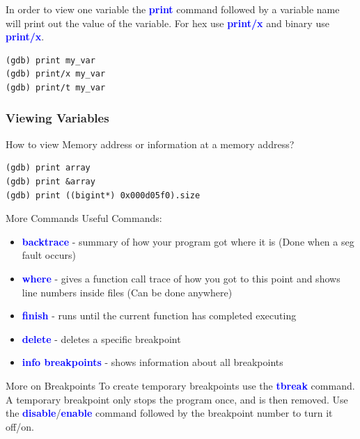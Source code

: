 \documentclass[11pt]{beamer}
\begin{document}
\begin{frame}[fragile]
In order to view one variable the \textbf{\textcolor{blue}{print}} command followed by a variable name will print out the value of the variable. For hex use \textbf{\textcolor{blue}{print/x}} and binary use \textbf{\textcolor{blue}{print/x}}.

\begin{lstlisting}[style=BashInputStyle]
(gdb) print my_var
(gdb) print/x my_var
(gdb) print/t my_var
\end{lstlisting}
\end{frame}

\begin{frame}[fragile]
\frametitle{Viewing Variables}

How to view Memory address or information at a memory address?
\begin{lstlisting}[style=BashInputStyle]
(gdb) print array
(gdb) print &array
(gdb) print ((bigint*) 0x000d05f0).size
\end{lstlisting} 
\end{frame}

\begin{frame}{More Commands}
Useful Commands:
\begin{itemize}
\item \textbf{\textcolor{blue}{backtrace}} - summary of how your program got where it is (Done when a seg fault occurs)
\item \textbf{\textcolor{blue}{where}} - gives a function call trace of how you got to this point and shows line numbers inside files (Can be done anywhere)
\item \textbf{\textcolor{blue}{finish}} - runs until the current function has completed executing
\item \textbf{\textcolor{blue}{delete}} - deletes a specific breakpoint
\item \textbf{\textcolor{blue}{info breakpoints}} - shows information about all breakpoints
\end{itemize}
\end{frame}

\begin{frame}{More on Breakpoints}
        To create temporary breakpoints use the \textbf{\textcolor{blue}{tbreak}} command. A temporary breakpoint only stops the program once, and is then removed.
        \break
        \break
        Use the \textbf{\textcolor{blue}{disable}}/\textbf{\textcolor{blue}{enable}} command followed by the breakpoint number to turn it off/on.
\end{frame}
\end{document}
